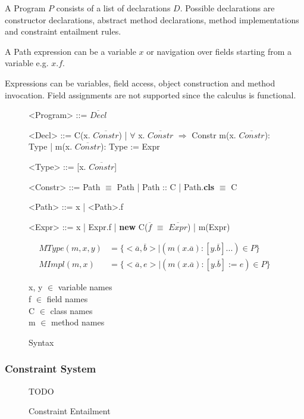 A Program $P$ consists of a list of declarations $D$.
Possible declarations are constructor declarations,
abstract method declarations, method implementations and constraint entailment rules.

A Path expression can be a variable $x$ or navigation over fields starting from a variable e.g. $x.f$.

Expressions can be variables, field access, object construction and method invocation.
Field assignments are not supported since the calculus is functional.

\begin{figure}
\setlength{\grammarindent}{5em} %
\begin{grammar}
<Program>  ::= $\overline{Decl}$

<Decl> ::= C(x. $\overline{Constr}$)
       | $\forall$ x. $\overline{Constr}$ $\Rightarrow$ Constr
       \alt m(x. $\overline{Constr}$): Type
       | m(x. $\overline{Constr}$): Type := Expr

<Type> ::= [x. $\overline{Constr}$]

<Constr> ::= Path $\equiv$ Path
           | Path :: C
           | Path.\textbf{cls} $\equiv$ C

<Path> ::= x
       | <Path>.f

<Expr> ::= x
       | Expr.f
       | \textbf{new} C($\overline{f}$ $\equiv$ $\overline{Expr}$)
       | m(Expr)
\end{grammar}

\begin{align*}
MType(m, x, y) &= \{ <\overline{a}, \overline{b}> | (m(x. \overline{a}): [y. \overline{b}]...) \in P \} \\
MImpl(m, x) &= \{<\overline{a}, e> | (m(x. \overline{a}): [y. \overline{b}] := e) \in P \}
\end{align*}

x, y $\in$ variable names\\
f $\in$ field names\\
C $\in$ class names\\
m $\in$ method names
\caption{Syntax}
\end{figure}

\subsubsection{Constraint System}
\begin{figure}
TODO
\caption{Constraint Entailment}
\end{figure}

